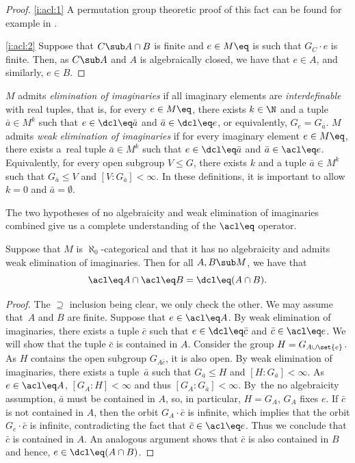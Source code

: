 \skpt
\begin{proof}
\eqref{i:acl:1} A permutation group theoretic proof of this fact can be found for example in \cite[Lem.\,2.4]{Evans2016}.

\eqref{i:acl:2} Suppose that $C \sub A \cap B$ is finite and $e \in M\eq$ is such that $G_C \cdot e$ is finite. Then, as $C \sub A$ and $A$ is algebraically closed, we have that $e \in A$, and similarly, $e \in B$.
\end{proof}

$M$ admits \emph{elimination of imaginaries} if all imaginary elements are \emph{interdefinable} with real tuples, that is, for every $e \in M\eq$, there exists $k \in \N$ and a tuple $\bar a \in M^k$ such that $e \in \dcl\eq \bar a$ and $\bar a \in \dcl\eq e$, or equivalently, $G_e = G_{\bar a}$. $M$ admits \emph{weak elimination of imaginaries} if for every imaginary element $e \in M\eq$, there exists a~real tuple $\bar a \in M^k$ such that $e \in \dcl\eq \bar a$ and $\bar a \in \acl\eq e$. Equivalently, for every open subgroup $V \leq G$, there exists $k$ and a tuple $\bar a \in M^k$ such that $G_{\bar a} \leq V$ and $[V : G_{\bar a}] < \infty$. In these definitions, it is important to allow $k = 0$ and $\bar a = \emptyset$.

The two hypotheses of no algebraicity and weak elimination of imaginaries combined give us a complete understanding of the $\acl\eq$ operator.
\begin{lemma}
\label{l:no-algeb-and-welim}
Suppose that $M$ is $\aleph_0$-categorical and that it has no algebraicity and admits weak elimination of imaginaries. Then for all $A, B \sub M$, we have that
\begin{equation*}
\acl\eq A \cap \acl\eq B = \dcl\eq (A \cap B).
\end{equation*}
\end{lemma}
\begin{proof}
The $\supseteq$ inclusion being clear, we only check the other. We may assume that~$A$ and $B$ are finite. Suppose that $e \in \acl\eq A$. By weak elimination of imaginaries, there exists a tuple $\bar c$ such that $e \in \dcl\eq \bar c$ and $\bar c \in \acl\eq e$. We will show that the tuple $\bar c$ is contained in $A$. Consider the group $H = G_{A \cup \set{e}}$. As $H$ contains the open subgroup $G_{A \bar c}$, it is also open. By weak elimination of imaginaries, there exists a tuple~$\bar a$ such that $G_{\bar a} \leq H$ and $[H : G_{\bar a}] < \infty$. As $e \in \acl\eq A$, $[G_A : H] < \infty$ and thus $[G_A : G_{\bar a}] < \infty$. By~the no algebraicity assumption, $\bar a$ must be contained in $A$, so, in particular, $H = G_A$, \ie $G_A$ fixes $e$. If $\bar c$ is not contained in $A$, then the orbit $G_A \cdot \bar c$ is infinite, which implies that the orbit $G_e \cdot \bar c$ is infinite, contradicting the fact that $\bar c \in \acl\eq e$. Thus we conclude that $\bar c$ is contained in $A$. An analogous argument shows that $\bar c$ is also contained in $B$ and hence, $e \in \dcl\eq (A \cap B)$.
\end{proof}

